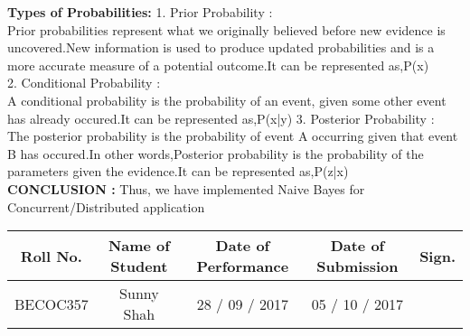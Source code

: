 \documentclass[11pt]{article}
\begin{document}
	\textbf{ Types of Probabilities:}
	1. Prior Probability : \\
	Prior probabilities represent what we originally believed before new evidence
	is uncovered.New information is used to produce updated probabilities
	and is a more accurate measure of a potential outcome.It can
	be represented as,P(x) \\
	2. Conditional Probability : \\
	A conditional probability is the probability of an event, given some
	other event has already occured.It can be represented as,P(x|y)
	3. Posterior Probability : \\
	The posterior probability is the probability of event A occurring given
	that event B has occured.In other words,Posterior probability is the
	probability of the parameters given the evidence.It can be represented
	as,P(z|x) \\
	
	\textbf{CONCLUSION :}
	Thus, we have implemented Naive Bayes for Concurrent/Distributed application
	
	\begin{center}
		\begin{tabular}
			{|c|c|c|c|c|}\hline
			{\bf Roll No.}		&{\bf Name of Student}	&{\bf Date of Performance}  				&{\bf Date of Submission}	&{\bf Sign.}  \\    \hline
			BECOC357	& Sunny Shah  & 28 / 09 / 2017		& 05 / 10 / 2017		&  \\ \hline
		\end{tabular}\\ 
	\end{center}
	
\end{document}
